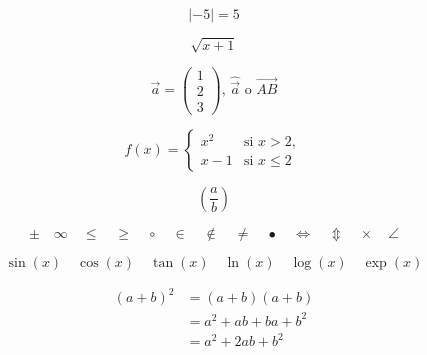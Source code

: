 \begin{equation*}
	\lvert -5 \rvert=5
\end{equation*}

\begin{equation*}
	\sqrt{x+1}
\end{equation*}

\begin{equation*}
	\vec{a} =\begin{pmatrix} 1\\2\\3 \end{pmatrix} \text{, } \widehat{\vec{a}} \text{ o } \overrightarrow{AB}
\end{equation*}

\begin{equation*}
	f(x) = \begin{cases}
	x^2 & \text{si } x>2,\\
	x-1 & \text{si } x\leq 2
	\end{cases}
\end{equation*}

\begin{equation*}
	\left(\frac{a}{b} \right)
\end{equation*}

\begin{equation*}
	\pm \quad \infty \quad \leq \quad \geq \quad \circ \quad \in \quad \notin \quad \neq \quad \bullet \quad \Leftrightarrow \quad \Updownarrow \quad \times \quad \angle
\end{equation*}

\begin{equation*}
	\sin(x) \quad \cos(x) \quad \tan(x) \quad \ln(x) \quad \log(x) \quad \exp(x)
\end{equation*}

\begin{align*}
	(a+b)^2 &= (a+b)(a+b)\\
	&= a^2+ab+ba+b^2\\
	&=a^2+2ab+b^2
\end{align*}